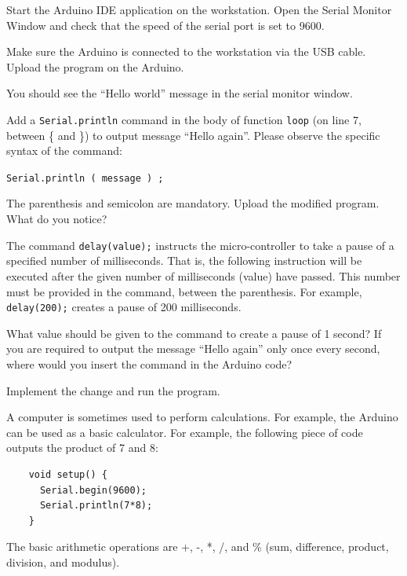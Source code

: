 \documentclass[12pt]{book}
\begin{document}
\begin{compactitem}[--]
\item Start the Arduino IDE application on the workstation. Open the
  Serial Monitor Window and check that the speed of the serial port is
  set to 9600.

\item Make sure the Arduino is connected to the workstation via the
  USB cable. Upload the program on the Arduino.

\item You should see the ``Hello world'' message in the serial monitor
  window.

\item Add a \texttt{Serial.println} command in the body of function
  \texttt{loop} (on line 7, between \{ and \}) to output message
  ``Hello again''. Please observe the specific syntax of the command:

  \lstinline{Serial.println ( message ) ;}

  The parenthesis and semicolon are mandatory. 
  Upload the modified program. What do you notice?

\item The command \lstinline$delay(value);$ instructs the
  micro-controller to take a pause of a specified number of
  milliseconds. That is, the following instruction will be executed
  after the given number of milliseconds (value) have passed. This
  number must be provided in the command, between the parenthesis. For
  example, \lstinline$delay(200);$ creates a pause of 200
  milliseconds. 

  What value should be given to the command to create a pause of 1
  second? If you are required to output the message ``Hello again''
  only once every second, where would you insert the command in the
  Arduino code?

  Implement the change and run the program.

\item A computer is sometimes used to perform calculations. For
  example, the Arduino can be used as a basic calculator. For example,
  the following piece of code outputs the product of 7 and 8:

  \begin{lstlisting}
    void setup() {
      Serial.begin(9600);
      Serial.println(7*8);
    }
  \end{lstlisting}

  The basic arithmetic operations are +, -, *, /, and \% (sum,
  difference, product, division, and modulus).


\end{compactitem}
\end{document}
